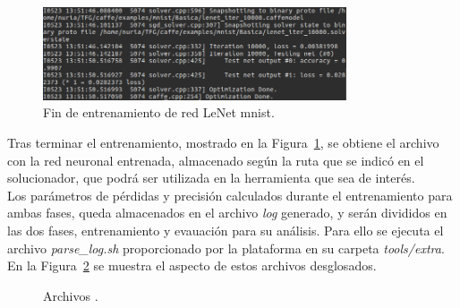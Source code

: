 	\begin{figure}[H]
		\begin{center}
			\includegraphics[width=0.8\textwidth]{figures/RedBasicaFin}
			\caption{Fin de entrenamiento de red LeNet \acrshort{mnist}.}
			\label{fig.finEntrBas}
		\end{center}
	\end{figure}
	
	Tras terminar el entrenamiento, mostrado en la Figura~\ref{fig.finEntrBas}, se obtiene el archivo con la red neuronal entrenada, almacenado según la ruta que se indicó en el solucionador, que podrá ser utilizada en la herramienta que sea de interés.\\

	Los parámetros de pérdidas y precisión calculados durante el entrenamiento para ambas fases, queda almacenados en el archivo \textit{log} generado, y serán divididos en las dos fases, entrenamiento y evauación para su análisis. Para ello se ejecuta el archivo \textit{parse\_log.sh} proporcionado por la plataforma en su carpeta \textit{tools/extra}. En la Figura~\ref{fig.parse} se muestra el aspecto de estos archivos desglosados.
	\vspace{10pt}
	
	\begin{figure}[H]
			\centering
			 \hspace{10pt}
			\caption{Archivos .}
			\label{fig.parse}
	\end{figure}

